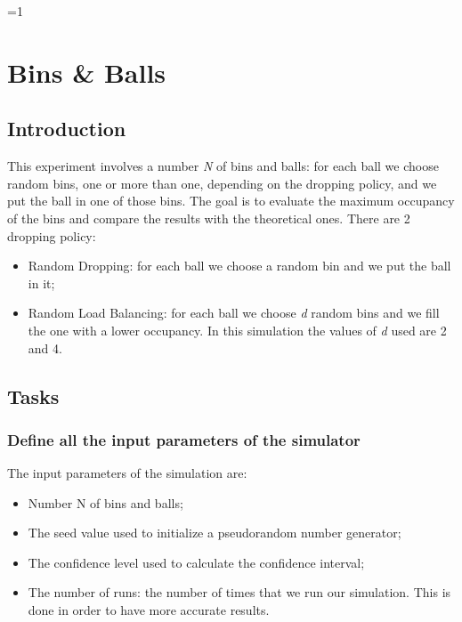 \documentclass{report}
\newcounter{debug}
\begin{document}
\ifnum\value{debug}=1 {
    
    
\chapter{Bins \& Balls}
	 
	\section{Introduction}
	 
	This experiment involves a number \emph{N} of bins and balls: for each ball we choose random bins, one or more than one, depending on the dropping policy, and we put the ball in one of those bins. The goal is to evaluate the maximum occupancy of the bins and compare the results with the theoretical ones. There are 2 dropping policy:
	\begin{itemize}
		\item Random Dropping: for each ball we choose a random bin and we put the ball in it; 
		\item Random Load Balancing: for each ball we choose \emph{d} random bins and we fill the one with a lower occupancy. In this simulation the values of \emph{d} used are 2 and 4.
	\end{itemize}

	\section{Tasks}
	 
		\subsection{Define all the input parameters of the simulator}
			The input parameters of the simulation are:
			\begin{itemize}
				\item Number N of bins and balls;
				\item The seed value used to initialize a pseudorandom number generator;
				\item The confidence level used to calculate the confidence interval;
				\item The number of runs: the number of times that we run our simulation. This is done in order to have more accurate results.
			\end{itemize}
			 
}
\end{document}
